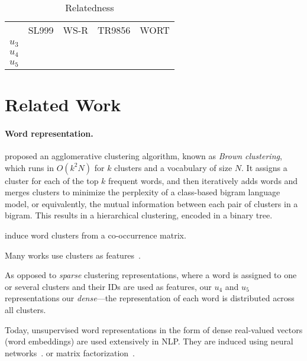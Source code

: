 \documentclass{article}
\begin{document}
    \begin{table}
    	\begin{tabular}{l|cccc}
    		& SL999 & WS-R & TR9856 & WORT \\
    		$u_3$ \\
    		$u_4$ \\
    		$u_5$
    	\end{tabular}
    	\caption{Relatedness}\label{tab:results_rel}
    \end{table}


    \section{Related Work}\label{sec:related_work}

    \paragraph{Word representation.}
    \citet{brown1992class} proposed an agglomerative clustering algorithm,
    known as \textit{Brown clustering},
    which runs in $O(k^2N)$ for $k$ clusters and a vocabulary of size $N$.
    It assigns a cluster for each of the top $k$ frequent words,
    and then iteratively adds words and merges clusters to minimize the
    perplexity of a class-based bigram language model,
    or equivalently, the mutual information between each pair of clusters in a bigram.
    This results in a hierarchical clustering, encoded in a binary tree.

    \citet{pereira1993distributional} induce word clusters from a co-occurrence matrix.

    Many works use clusters as features~\cite{miller2004name,koo2008simple,huang2009distributional,zhao2009multilingual}.
    
    As opposed to \textit{sparse} clustering representations, where a word is assigned
    to one or several clusters and their IDs are used as features,
    our $u_4$ and $u_5$ representations our \textit{dense}---the representation of each
    word is distributed across all clusters.

    Today, unsupervised word representations in the form of dense real-valued vectors
    (word embeddings) are used extensively in NLP.
    They are induced using neural networks~\cite{bengio2003neural,mnih2007three,collobert2008unified,turian2010word,mikolov2013efficient}.
    or matrix factorization~\cite{pennington2014glove}.
    
\end{document}
